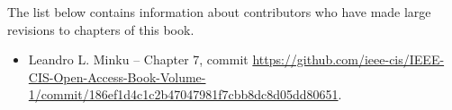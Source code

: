 
\contributors

The list below contains information about contributors who have made large revisions to chapters of this book.

\begin{itemize}
\item Leandro L. Minku -- Chapter 7, commit \url{https://github.com/ieee-cis/IEEE-CIS-Open-Access-Book-Volume-1/commit/186ef1d4c1c2b47047981f7cbb8dc8d05dd80651}.
\end{itemize}

